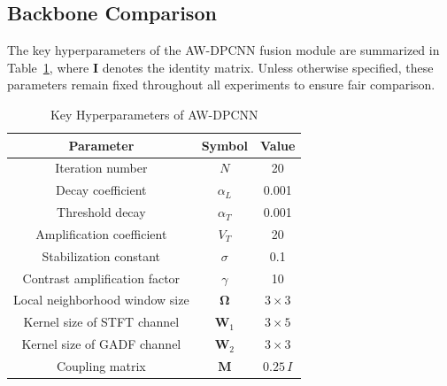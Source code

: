 \documentclass[journal]{IEEEtran}
\begin{document}
\subsection{Backbone Comparison}
\label{sec:backbone_comparison}
The key hyperparameters of the AW-DPCNN fusion module are summarized in Table~\ref{tab:awdpcnn_params}, where $\mathbf I$ denotes the identity matrix. Unless otherwise specified, these parameters remain fixed throughout all experiments to ensure fair comparison. 
\begin{table}
	\centering
	\caption{Key Hyperparameters of AW-DPCNN}
	\label{tab:awdpcnn_params}
	\begin{tabular}{ccc}
		\hline
		\textbf{Parameter} & \textbf{Symbol} & \textbf{Value} \\
		\hline
		Iteration number & $N$ & 20 \\
		Decay coefficient & $\alpha_L$ & 0.001 \\
		Threshold decay & $\alpha_T$ & 0.001 \\
		Amplification coefficient & $V_T$ & 20 \\
		Stabilization constant & $\sigma$ & 0.1 \\
		Contrast amplification factor & $\gamma$ & 10 \\
		Local neighborhood window size & $\boldsymbol{\Omega}$ & $3 \times 3$ \\
		Kernel size of STFT channel & $\boldsymbol{W}_1$ & $3 \times 5$ \\
		Kernel size of GADF channel & $\boldsymbol{W}_2$ & $3 \times 3$ \\
		Coupling matrix & $\boldsymbol{M}$ & $$0.25\,I$$ \\
		\hline
	\end{tabular}
\end{table}
\end{document}
